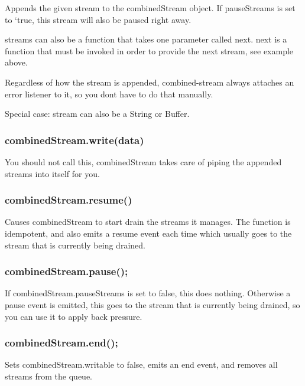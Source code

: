 Appends the given {\ttfamily stream} to the combined\+Stream object. If {\ttfamily pause\+Streams} is set to `true, this stream will also be paused right away.

{\ttfamily streams} can also be a function that takes one parameter called {\ttfamily next}. {\ttfamily next} is a function that must be invoked in order to provide the {\ttfamily next} stream, see example above.

Regardless of how the {\ttfamily stream} is appended, combined-\/stream always attaches an {\ttfamily \textquotesingle{}error\textquotesingle{}} listener to it, so you don\textquotesingle{}t have to do that manually.

Special case\+: {\ttfamily stream} can also be a String or Buffer.

\subsubsection*{combined\+Stream.\+write(data)}

You should not call this, {\ttfamily combined\+Stream} takes care of piping the appended streams into itself for you.

\subsubsection*{combined\+Stream.\+resume()}

Causes {\ttfamily combined\+Stream} to start drain the streams it manages. The function is idempotent, and also emits a {\ttfamily \textquotesingle{}resume\textquotesingle{}} event each time which usually goes to the stream that is currently being drained.

\subsubsection*{combined\+Stream.\+pause();}

If {\ttfamily combined\+Stream.\+pause\+Streams} is set to {\ttfamily false}, this does nothing. Otherwise a {\ttfamily \textquotesingle{}pause\textquotesingle{}} event is emitted, this goes to the stream that is currently being drained, so you can use it to apply back pressure.

\subsubsection*{combined\+Stream.\+end();}

Sets {\ttfamily combined\+Stream.\+writable} to false, emits an {\ttfamily \textquotesingle{}end\textquotesingle{}} event, and removes all streams from the queue.

